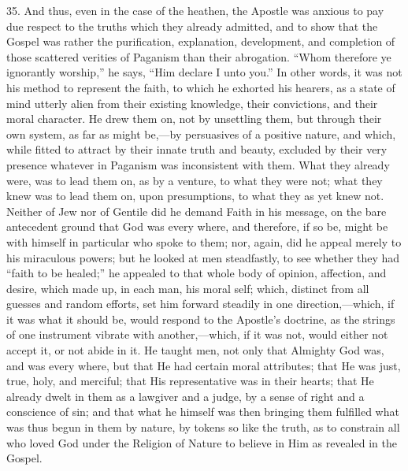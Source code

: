 35. And thus, even in the case of the heathen, the Apostle was
anxious to pay due respect to the truths which they already admitted,
and to show that the Gospel was rather the purification, explanation,
development, and completion of those scattered verities of Paganism
than their abrogation. ``Whom therefore ye ignorantly
worship,'' he says, ``Him declare I unto you.'' In other
words, it was not his method to represent the faith, to which he
exhorted his hearers, as a state of mind utterly alien from their
existing knowledge, their convictions, and their moral character. He
drew them on, not by unsettling them, but through their own system, as
far as might be,—by persuasives of a positive nature, and which,
while fitted to attract by their innate truth and beauty, excluded by
their very presence whatever in Paganism was inconsistent with them.
What they already were, was to lead them on, as by a venture, to what
they were not; what they knew was to lead them on, upon presumptions,
to what they as yet knew not. Neither of Jew nor of Gentile did he
demand Faith in his message, on the bare antecedent ground that God
was every where, and therefore, if so be, might be with himself in
particular who spoke to them; nor, again, did he appeal merely to his
miraculous powers; but he looked at men steadfastly, to see whether
they had ``faith to be healed;'' he appealed to that whole
body of opinion, affection, and desire, which made up, in each man,
his moral self; which, distinct from all guesses and random efforts,
set him forward steadily in one direction,—which, if it was what it
should be, would respond to the Apostle's doctrine, as the strings of
one instrument vibrate with another,—which, if it was not, would
either not accept it, or not abide in it. He taught men, not only that
Almighty God was, and was every where, but that He had certain moral
attributes; that He was just, true, holy, and merciful; that His
representative was in their hearts; that He already dwelt in them as a
lawgiver and a judge, by a sense of right and a conscience of sin; and
that what he himself was then bringing them fulfilled what was thus
begun in them by nature, by tokens so like the truth, as to constrain
all who loved God under the Religion of Nature to believe in Him as
revealed in the Gospel.


